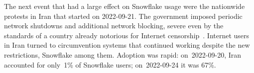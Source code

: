 \documentclass[letterpaper,twocolumn]{article}
\begin{document}
The next event that had a large effect on Snowflake usage
were the nationwide protests in Iran that started on \mbox{2022-09-21}.
The government imposed periodic network shutdowns
and additional network blocking,
severe even by the standards of a country already notorious
for Internet censorship~\cite{ooni-2022-iran-blocks-social-media-mahsa-amini-protests}.
Internet users in Iran turned to circumvention systems
that continued working despite the new restrictions,
Snowflake among them.
Adoption was rapid:
on~\mbox{2022-09-20}, Iran accounted for only~1\% of Snowflake users;
on~\mbox{2022-09-24} it was 67\%.
\end{document}
